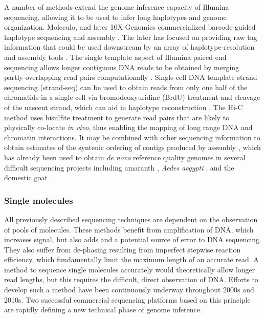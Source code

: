 A number of methods extend the genome inference capacity of Illumina sequencing, allowing it to be used to infer long haplotypes and genome organization.
Moleculo, and later 10X Genomics commercialized barcode-guided haplotype sequencing and assembly \cite{zheng2016haplotyping}.
The later has focused on providing raw tag information that could be used downstream by an array of haplotype-resolution and assembly tools \cite{mostovoy2016hybrid}.
The single template aspect of Illumina paired end sequencing allows longer contiguous DNA reads to be obtained by merging partly-overlapping read pairs computationally \cite{magovc2011flash}.
Single-cell DNA template strand sequencing (strand-seq) can be used to obtain reads from only one half of the chromatids in a single cell \cite{falconer2012dna} via bromodeoxyuridine (BrdU) treatment and cleavage of the nascent strand, which can aid in haplotype reconstruction \cite{porubsky2016direct}.
The Hi-C method \cite{lieberman2009comprehensive} uses bisulfite treatment to generate read pairs that are likely to physically co-locate \emph{in vivo}, thus enabling the mapping of long range DNA and chromatin interactions.
It may be combined with other sequencing information to obtain estimates of the syntenic ordering of contigs produced by assembly \cite{ghurye2018integrating}, which has already been used to obtain \emph{de novo} reference quality genomes in several difficult sequencing projects including amaranth \cite{lightfoot2017single}, \emph{Aedes aegypti} \cite{dudchenko2017novo}, and the domestic goat \cite{bickhart2017single}.

\subsubsection{Single molecules}

All previously described sequencing techniques are dependent on the observation of pools of molecules.
These methods benefit from amplification of DNA, which increases signal, but also adds and a potential source of error to DNA sequencing.
They also suffer from de-phasing resulting from imperfect stepwise reaction efficiency, which fundamentally limit the maximum length of an accurate read.
A method to sequence single molecules accurately would theoretically allow longer read lengths, but this requires the difficult, direct observation of DNA.
Efforts to develop such a method have been continuously underway throughout 2000s and 2010s.
Two successful commercial sequencing platforms based on this principle are rapidly defining a new technical phase of genome inference.

